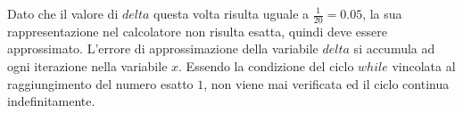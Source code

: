 Dato che il valore di \(delta\) questa volta risulta uguale a \(\frac{1}{20} = 0.05\), la sua rappresentazione nel calcolatore non risulta esatta, quindi deve essere approssimato. L'errore di approssimazione della variabile \(delta\) si accumula ad ogni iterazione nella variabile \(x\). Essendo la condizione del ciclo \(while\) vincolata al raggiungimento del numero esatto \(1\), non viene mai verificata ed il ciclo continua indefinitamente.
